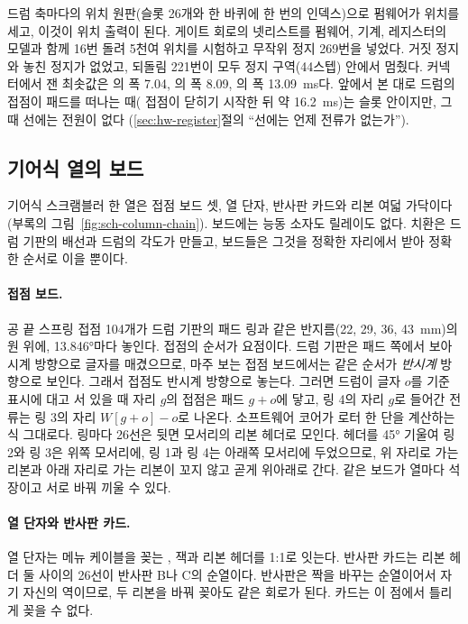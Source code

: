 드럼 축마다의 위치 원판(슬롯 26개와 한 바퀴에 한 번의 인덱스)으로 펌웨어가 위치를 세고, 이것이 위치 출력이 된다. 게이트
회로의 넷리스트를 펌웨어, 기계, 레지스터의 모델과 함께 16번 돌려 5천여 위치를 시험하고 무작위 정지 269번을 넣었다.
거짓 정지와 놓친 정지가 없었고, 되돌림 221번이 모두 정지 구역(44스텝) 안에서 멈췄다. 커넥터에서 잰 최솟값은
의 폭 7.04, 의 폭 8.09, 의 폭 13.09~ms다. 앞에서 본 대로 드럼의 접점이 패드를 떠나는
때( 접점이 닫히기 시작한 뒤 약 16.2~ms)는  슬롯 안이지만, 그때 선에는 전원이 없다
(\ref{sec:hw-register}절의 ``선에는 언제 전류가 없는가'').

\subsection{기어식 열의 보드}\label{sec:hw-boards-gear}

기어식 스크램블러 한 열은 접점 보드 셋, 열 단자, 반사판 카드와 리본 여덟 가닥이다(부록의 그림~\ref{fig:sch-column-chain}).
보드에는 능동 소자도 릴레이도 없다. 치환은 드럼 기판의 배선과 드럼의 각도가 만들고, 보드들은 그것을 정확한 자리에서
받아 정확한 순서로 이을 뿐이다.

\paragraph{접점 보드.} 공 끝 스프링 접점 104개가 드럼 기판의 패드 링과 같은 반지름(22, 29, 36, 43~mm)의 원 위에,
13.846°마다 놓인다. 접점의 순서가 요점이다. 드럼 기판은 패드 쪽에서 보아 시계 방향으로 글자를 매겼으므로, 마주 보는 접점
보드에서는 같은 순서가 \emph{반시계} 방향으로 보인다. 그래서 접점도 반시계 방향으로 놓는다. 그러면 드럼이 글자 $o$를
기준 표시에 대고 서 있을 때 자리 $g$의 접점은 패드 $g + o$에 닿고, 링 4의 자리 $g$로 들어간 전류는 링 3의 자리
$W[g+o] - o$로 나온다. 소프트웨어 코어가 로터 한 단을 계산하는 식 그대로다. 링마다 26선은 뒷면 모서리의 리본 헤더로
모인다. 헤더를 45° 기울여 링 2와 링 3은 위쪽 모서리에, 링 1과 링 4는 아래쪽 모서리에 두었으므로, 위 자리로 가는 리본과
아래 자리로 가는 리본이 꼬지 않고 곧게 위아래로 간다. 같은 보드가 열마다 석 장이고 서로 바꿔 끼울 수 있다.

\paragraph{열 단자와 반사판 카드.} 열 단자는 메뉴 케이블을 꽂는 ,  잭과 리본 헤더를 1:1로 잇는다.
반사판 카드는 리본 헤더 둘 사이의 26선이 반사판 B나 C의 순열이다. 반사판은 짝을 바꾸는 순열이어서 자기 자신의
역이므로, 두 리본을 바꿔 꽂아도 같은 회로가 된다. 카드는 이 점에서 틀리게 꽂을 수 없다.

